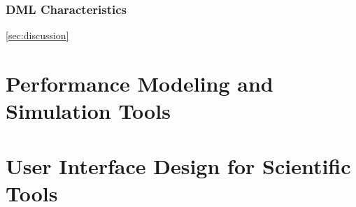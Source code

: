 
\subsubsection*{DML Characteristics}
\ref{sec:discussion}


\section{Performance Modeling and Simulation Tools}



\section{User Interface Design for Scientific Tools}




